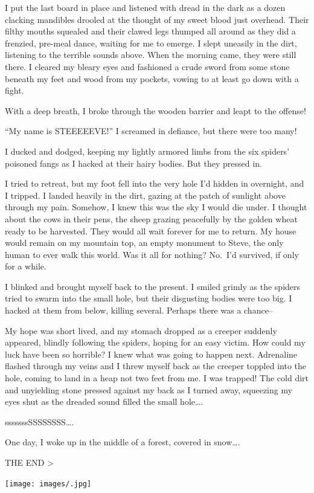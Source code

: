 \documentclass[
]{book}
\begin{document}
I put the last board in place and listened with dread in the dark as a dozen clacking mandibles drooled at the thought of my sweet blood just overhead. Their filthy mouths squealed and their clawed legs thumped all around as they did a frenzied, pre-meal dance, waiting for me to emerge. I slept uneasily in the dirt, listening to the terrible sounds above. When the morning came, they were still there. I cleared my bleary eyes and fashioned a crude sword from some stone beneath my feet and wood from my pockets, vowing to at least go down with a fight.

With a deep breath, I broke through the wooden barrier and leapt to the offense!

``My name is STEEEEEVE!'' I screamed in defiance, but there were too many!

I ducked and dodged, keeping my lightly armored limbs from the six spiders' poisoned fangs as I hacked at their hairy bodies. But they pressed in.

I tried to retreat, but my foot fell into the very hole I'd hidden in overnight, and I tripped. I landed heavily in the dirt, gazing at the patch of sunlight above through my pain. Somehow, I knew this was the sky I would die under. I thought about the cows in their pens, the sheep grazing peacefully by the golden wheat ready to be harvested. They would all wait forever for me to return. My house would remain on my mountain top, an empty monument to Steve, the only human to ever walk this world. Was it all for nothing? No.~I'd survived, if only for a while.

I blinked and brought myself back to the present. I smiled grimly as the spiders tried to swarm into the small hole, but their disgusting bodies were too big. I hacked at them from below, killing several. Perhaps there was a chance--

My hope was short lived, and my stomach dropped as a creeper suddenly appeared, blindly following the spiders, hoping for an easy victim. How could my luck have been so horrible? I knew what was going to happen next. Adrenaline flashed through my veins and I threw myself back as the creeper toppled into the hole, coming to land in a heap not two feet from me. I was trapped! The cold dirt and unyielding stone pressed against my back as I turned away, squeezing my eyes shut as the dreaded sound filled the small hole\ldots.

sssssssSSSSSSSS\ldots.

One day, I woke up in the middle of a forest, covered in snow\ldots.

THE END
\textgreater{}

\texttt{[image: images/.jpg]}

\backmatter
\backmatter
\printindex
\end{document}

